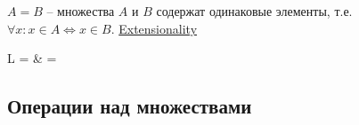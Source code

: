\documentclass[a4paper,10pt]{article}
\begin{document}
\begin{terms}
    \item $A = B$ -- множества $A$ и $B$ содержат одинаковые элементы, т.е. $\forall x : x \in A \iff x \in B$.
    \hfill\href{https://en.wikipedia.org/wiki/Axiom_of_extensionality}{Extensionality}
    \begin{terms}
        \item \begin{tabular}{\ML{6cm} L}
             = 
            &  = 
        \end{tabular}
    \end{terms}
\end{terms}


\subsection{Операции над множествами}
\end{document}
